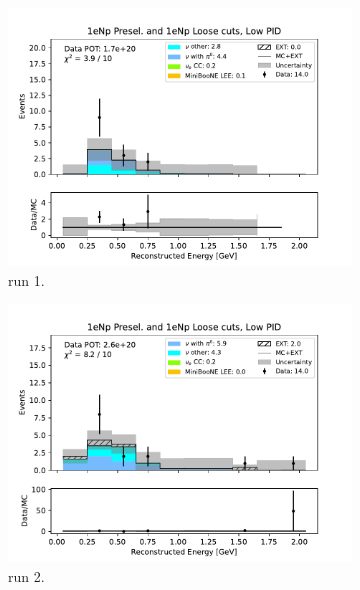 \begin{figure}
    \centering
    \begin{subfigure}{0.33\linewidth}
        \includegraphics[width=\linewidth]{technote/Sidebands/Figures/FarSideband/far_sideband_reco_e_run1_NP_NPL_LOW_PID.pdf}
        \caption{run 1.}
    \end{subfigure}%
    \begin{subfigure}{0.33\linewidth}
        \includegraphics[width=\linewidth]{technote/Sidebands/Figures/FarSideband/far_sideband_reco_e_run2_NP_NPL_LOW_PID.pdf}
        \caption{run 2.}
    \end{subfigure}%
    \begin{subfigure}{0.33\linewidth}

\end{subfigure}
\end{figure}
